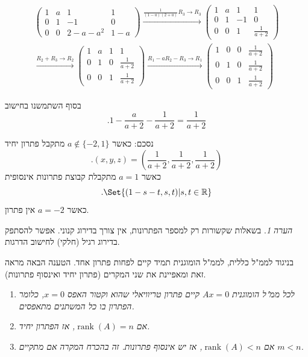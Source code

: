 \documentclass[
  hebrew,
  12pt,
  a4paper,
  oneside]{book}
\theoremstyle{definition}
\theoremstyle{remark}
\theoremstyle{plain}
\theoremstyle{remark}
\newtheorem*{remark}{הערה}
\begin{document}
\begin{example}
\[\begin{aligned}
\left(\begin{array}{rrr|r}
1 & a & 1 & 1 \\
0 & 1 & -1 & 0\\
0 & 0 & 2-a-a^2 & 1-a
\end{array}\right)
\xrightarrow{\frac{1}{(1-a)(2+a)}R_3\to R_3}
\left(\begin{array}{rrr|r}
1 & a & 1 & 1 \\
0 & 1 & -1 & 0\\
0 & 0 & 1 & \frac{1}{a+2}
\end{array}\right) \\
\xrightarrow{R_2+R_3\to R_2} 
\left(\begin{array}{rrr|r}
1 & a & 1 & 1 \\
0 & 1 & 0 & \frac{1}{a+2}\\
0 & 0 & 1 & \frac{1}{a+2}
\end{array}\right)
\xrightarrow{R_1-aR_2-R_3\to R_1} 
\left(\begin{array}{rrr|r}
1 & 0 & 0 & \frac{1}{a+2} \\
0 & 1 & 0 & \frac{1}{a+2}\\
0 & 0 & 1 & \frac{1}{a+2}
\end{array}\right)
\end{aligned}\]

בסוף השתמשנו בחישוב \[.1-\frac{a}{a+2}-\frac{1}{a+2}=\frac{1}{a+2}\]

נסכם: כאשר \(a\notin\{-2,1\}\) מתקבל פתרון יחיד
\[.(x,y,z)=(\frac{1}{a+2},\frac{1}{a+2},\frac{1}{a+2})\] כאשר \(a=1\)
מתקבלת קבוצת פתרונות אינסופית \[.\Set{(1-s-t,s,t)|s,t\in\mathbb R}\]
כאשר \(a=-2\) אין פתרון.

\end{example}

\begin{remark}
בשאלות שקשורות רק למספר הפתרונות, אין צורך בדירוג קנוני. אפשר להסתפק
בדירוג רגיל (חלקי) לחישוב הדרגות.
\end{remark}

בניגוד לממ"ל כללית, לממ"ל הומוגנית תמיד קיים לפחות פתרון אחד. הטענה הבאה
מראה זאת ומאפיינת את שני המקרים (פתרון יחיד ואינסוף פתרונות).

\begin{proposition}

\begin{enumerate}
\def\labelenumi{\arabic{enumi}.}
\item
  \emph{לכל ממ"ל הומוגנית \(Ax=0\) קיים פתרון טריוויאלי שהוא וקטור האפס
  \(x=0\), כלומר הפתרון בו כל המשתנים מתאפסים.}
\item
  \emph{אם \(\mathop{\mathrm{rank}}(A)=n\), אז הפתרון יחיד.}
\item
  \emph{אם \(\mathop{\mathrm{rank}}(A)<n\), אז יש אינסוף פתרונות. זה
  בהכרח המקרה אם מתקיים \(m<n\).}
\end{enumerate}

\end{proposition}
\end{document}
